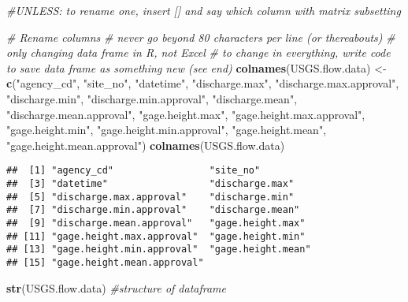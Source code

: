 \documentclass[]{article}
\newenvironment{Shaded}{\begin{snugshade}}{\end{snugshade}}
\newcommand{\CommentTok}[1]{\textcolor[rgb]{0.56,0.35,0.01}{\textit{#1}}}
\newcommand{\KeywordTok}[1]{\textcolor[rgb]{0.13,0.29,0.53}{\textbf{#1}}}
\newcommand{\NormalTok}[1]{#1}
\newcommand{\StringTok}[1]{\textcolor[rgb]{0.31,0.60,0.02}{#1}}
\begin{document}
\begin{Shaded}
\begin{Highlighting}[]
\CommentTok{#UNLESS: to rename one, insert [] and say which column with matrix subsetting}

\CommentTok{# Rename columns}
\CommentTok{# never go beyond 80 characters per line (or thereabouts)}
\CommentTok{# only changing data frame in R, not Excel}
\CommentTok{# to change in everything, write code to save data frame as something new (see end)}
\KeywordTok{colnames}\NormalTok{(USGS.flow.data) <-}\StringTok{ }\KeywordTok{c}\NormalTok{(}\StringTok{"agency_cd"}\NormalTok{, }\StringTok{"site_no"}\NormalTok{, }\StringTok{"datetime"}\NormalTok{, }
                              \StringTok{"discharge.max"}\NormalTok{, }\StringTok{"discharge.max.approval"}\NormalTok{, }
                              \StringTok{"discharge.min"}\NormalTok{, }\StringTok{"discharge.min.approval"}\NormalTok{, }
                              \StringTok{"discharge.mean"}\NormalTok{, }\StringTok{"discharge.mean.approval"}\NormalTok{, }
                              \StringTok{"gage.height.max"}\NormalTok{, }\StringTok{"gage.height.max.approval"}\NormalTok{, }
                              \StringTok{"gage.height.min"}\NormalTok{, }\StringTok{"gage.height.min.approval"}\NormalTok{, }
                              \StringTok{"gage.height.mean"}\NormalTok{, }\StringTok{"gage.height.mean.approval"}\NormalTok{)}
\KeywordTok{colnames}\NormalTok{(USGS.flow.data)}
\end{Highlighting}
\end{Shaded}

\begin{verbatim}
##  [1] "agency_cd"                 "site_no"                  
##  [3] "datetime"                  "discharge.max"            
##  [5] "discharge.max.approval"    "discharge.min"            
##  [7] "discharge.min.approval"    "discharge.mean"           
##  [9] "discharge.mean.approval"   "gage.height.max"          
## [11] "gage.height.max.approval"  "gage.height.min"          
## [13] "gage.height.min.approval"  "gage.height.mean"         
## [15] "gage.height.mean.approval"
\end{verbatim}

\begin{Shaded}
\begin{Highlighting}[]
\KeywordTok{str}\NormalTok{(USGS.flow.data) }\CommentTok{#structure of dataframe}
\end{Highlighting}
\end{Shaded}
\end{document}
